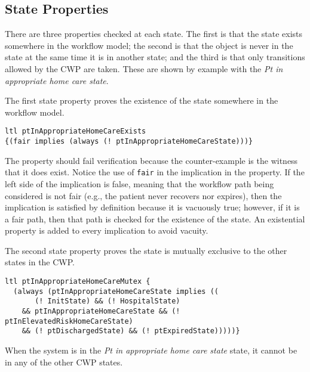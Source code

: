 \begin{comment}
The term \emph{fair} is a reference to the over-approximating nature of the workflow model. Indeed, in considering the workflow in \figref{fig:bpmn}, it is possible that a patient is never discharged or that the patient never expires. Such a behavior is \emph{not fair} because it is not emblematic of the real world---patients eventually are discharged or expire. As such, the property proves the existence of paths in the workflow that end in the goal states, and this same property is used later to restrict verification to only those paths that end in one of goal states thereby excluding from consideration, in verification, any infinite workflow behaviors where the patient never recovers or expires.
\end{comment}

\subsection{State Properties}
There are three properties checked at each state. The first is that the state exists somewhere in the workflow model; the second is that the object is never in the state at the same time it is in another state; and the third is that only transitions allowed by the CWP are taken. These are shown by example with the \emph{Pt in appropriate home care state}.

The first state property proves the existence of the state somewhere in the workflow model.
%
{\small
\begin{lstlisting}[style=myPromela]
ltl ptInAppropriateHomeCareExists 
{(fair implies (always (! ptInAppropriateHomeCareState)))}
\end{lstlisting}
}
%
\noindent The property should fail verification because the counter-example is the witness that it does exist. Notice the use of \texttt{fair} in the implication in the property. If the left side of the implication is false, meaning that the workflow path being considered is not fair (e.g., the patient never recovers nor expires), then the implication is satisfied by definition because it is vacuously true; however, if it is a fair path, then that path is checked for the existence of the state. An existential property is added to every implication to avoid vacuity.

The second state property proves the state is mutually exclusive to the other states in the CWP.
%
{\small
\begin{lstlisting}[style=myPromela]
ltl ptInAppropriateHomeCareMutex {
  (always (ptInAppropriateHomeCareState implies ((
       (! InitState) && (! HospitalState) 
    && ptInAppropriateHomeCareState && (! ptInElevatedRiskHomeCareState) 
    && (! ptDischargedState) && (! ptExpiredState)))))}
\end{lstlisting}
}
%
\noindent When the system is in the \emph{Pt in appropriate home care state} state, it cannot be in any of the other CWP states. 

